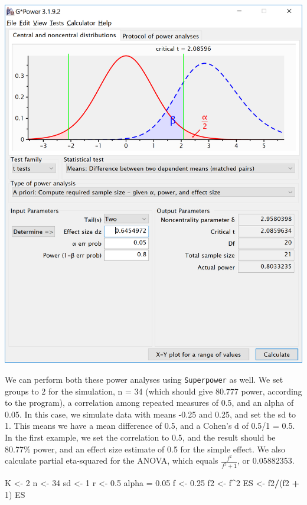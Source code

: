 \documentclass[
]{book}
\newenvironment{Shaded}{\begin{snugshade}}{\end{snugshade}}
\newcommand{\DecValTok}[1]{\textcolor[rgb]{0.00,0.00,0.81}{#1}}
\newcommand{\FloatTok}[1]{\textcolor[rgb]{0.00,0.00,0.81}{#1}}
\newcommand{\NormalTok}[1]{#1}
\newcommand{\OperatorTok}[1]{\textcolor[rgb]{0.81,0.36,0.00}{\textbf{#1}}}
\newcommand{\StringTok}[1]{\textcolor[rgb]{0.31,0.60,0.02}{#1}}
\begin{document}
\includegraphics{screenshots/gpower_10.png}

\newpage

We can perform both these power analyses using \texttt{Superpower} as well. We set groups to 2 for the simulation, n = 34 (which should give 80.777 power, according to the \citet{faul2007g} program), a correlation among repeated measures of 0.5, and an alpha of 0.05. In this case, we simulate data with means -0.25 and 0.25, and set the sd to 1. This means we have a mean difference of 0.5, and a Cohen's d of 0.5/1 = 0.5. In the first example, we set the correlation to 0.5, and the result should be 80.77\% power, and an effect size estimate of 0.5 for the simple effect. We also calculate partial eta-squared for the ANOVA, which equals \(\frac{f^2}{f^2+1}\), or 0.05882353.

\begin{Shaded}
\begin{Highlighting}[]
\NormalTok{K <-}\StringTok{ }\DecValTok{2}
\NormalTok{n <-}\StringTok{ }\DecValTok{34}
\NormalTok{sd <-}\StringTok{ }\DecValTok{1}
\NormalTok{r <-}\StringTok{ }\FloatTok{0.5}
\NormalTok{alpha =}\StringTok{ }\FloatTok{0.05}
\NormalTok{f <-}\StringTok{ }\FloatTok{0.25}
\NormalTok{f2 <-}\StringTok{ }\NormalTok{f}\OperatorTok{^}\DecValTok{2}
\NormalTok{ES <-}\StringTok{ }\NormalTok{f2}\OperatorTok{/}\NormalTok{(f2 }\OperatorTok{+}\StringTok{ }\DecValTok{1}\NormalTok{)}
\NormalTok{ES}
\end{Highlighting}
\end{Shaded}
\end{document}
